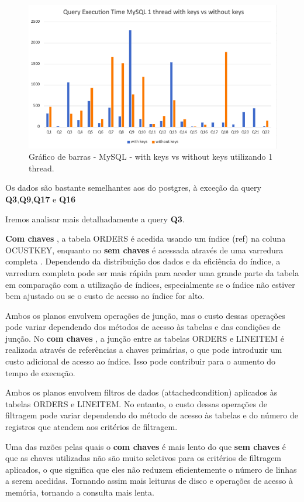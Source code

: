 \documentclass{article}
\begin{document}
\begin{figure}[H]
  \centering
  \includegraphics[width=\textwidth]{Graphs/mysqlonethread_withkeysvswithoutkeys.png}
  \caption{Gráfico de barras - MySQL - with keys vs without keys utilizando 1 thread.} 
  \label{fig:PKCreation2}
\end{figure}
Os dados são bastante semelhantes aos do postgres, à exceção da query \textbf{Q3},\textbf{Q9},\textbf{Q17} e \textbf{Q16}

Iremos analisar mais detalhadamente a query \textbf{Q3}.

\textbf{Com chaves} ,  a tabela ORDERS é acedida usando um índice (ref) na coluna O\underline{}CUSTKEY, enquanto no \textbf{sem chaves} é acessada através de uma varredura completa . Dependendo da distribuição dos dados e da eficiência do índice, a varredura completa pode ser mais rápida para aceder uma grande parte da tabela em comparação com a utilização de índices, especialmente se o índice não estiver bem ajustado ou se o custo de acesso ao índice for alto.

Ambos os planos envolvem operações de junção, mas o custo dessas operações pode variar dependendo dos métodos de acesso às tabelas e das condições de junção. No \textbf{com chaves} , a junção entre as tabelas ORDERS e LINEITEM é realizada através de referências a chaves primárias, o que pode introduzir um custo adicional de acesso ao índice. Isso pode contribuir para o aumento do tempo de execução.

Ambos os planos envolvem filtros de dados (attached\underline{}condition) aplicados às tabelas ORDERS e LINEITEM. No entanto, o custo dessas operações de filtragem pode variar dependendo do método de acesso às tabelas e do número de registros que atendem aos critérios de filtragem.

Uma das razões pelas quais o \textbf{com chaves} é mais lento do que \textbf{sem chaves} é que as chaves utilizadas não são muito seletivos para os critérios de filtragem aplicados, o que significa que eles não reduzem eficientemente o número de linhas a serem acedidas. Tornando assim mais leituras de disco e operações de acesso à memória, tornando a consulta mais lenta.
\end{document}
